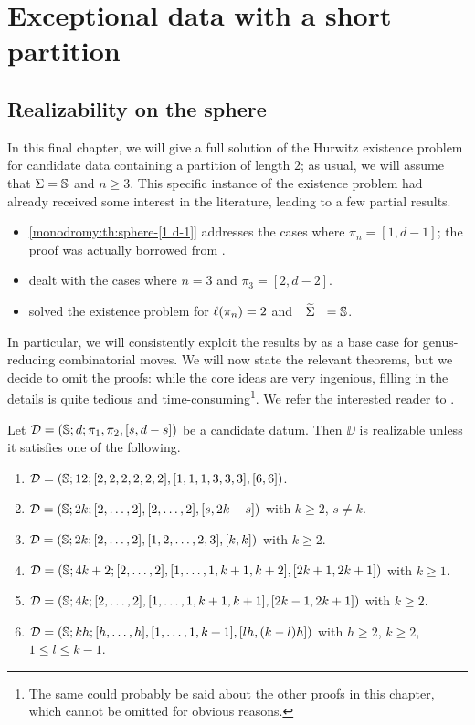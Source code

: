 \chapter{Exceptional data with a short partition}\label{short-partition:ch}
\smallvertices{}

\section{Realizability on the sphere}

In this final chapter, we will give a full solution of the Hurwitz existence problem for candidate data containing a partition of length $2$; as usual, we will assume that $\Sigma=\mathbb{S}{}$ and $n\ge 3$. This specific instance of the existence problem had already received some interest in the literature, leading to a few partial results.
\begin{itemize}
\item \cref{monodromy:th:sphere-[1 d-1]} addresses the cases where $\pi_n=[1,d-1]$; the proof was actually borrowed from .
\item \textcite{pervova-existence-ii} dealt with the cases where $n=3$ and $\pi_3=[2,d-2]$.
\item \textcite{pakovich} solved the existence problem for $\ell(\pi_n)=2$ and $\tSigma=\sphere{}$.
\end{itemize}
In particular, we will consistently exploit the results by \citeauthor{pakovich} as a base case for genus-reducing combinatorial moves. We will now state the relevant theorems, but we decide to omit the proofs: while the core ideas are very ingenious, filling in the details is quite tedious and time-consuming\footnote{The same could probably be said about the other proofs in this chapter, which cannot be omitted for obvious reasons.}. We refer the interested reader to \cite{pakovich}.

\begin{theorem}\label{short-partition:th:realizability-on-sphere-n-3}
Let $\mathcal{D}=(\mathbb{S}{};d;\pi_1,\pi_2,[s,d-s])$ be a candidate datum. Then $\DD$ is realizable unless it satisfies one of the following.
\begin{enumerate}[(1)]
\item $\mathcal{D}=(\mathbb{S}{};12;[2,2,2,2,2,2],[1,1,1,3,3,3],[6,6])$.
\item $\mathcal{D}=(\mathbb{S}{};2k;[2,\ldots,2],[2,\ldots,2],[s,2k-s])$ with $k\ge 2$, $s\neq k$.
\item $\mathcal{D}=(\mathbb{S}{};2k;[2,\ldots,2],[1,2,\ldots,2,3],[k,k])$ with $k\ge2$.
\item $\mathcal{D}=(\mathbb{S}{};4k+2;[2,\ldots,2],[1,\ldots,1,k+1,k+2],[2k+1,2k+1])$ with $k\ge 1$.
\item $\mathcal{D}=(\mathbb{S}{};4k;[2,\ldots,2],[1,\ldots,1,k+1,k+1],[2k-1,2k+1])$ with $k\ge2$.
\item\label{short-partition:th:realizability-on-sphere-n-3:it:6} $\mathcal{D}=(\mathbb{S}{};kh;[h,\ldots,h],[1,\ldots,1,k+1],[lh,(k-l)h])$ with $h\ge 2$, $k\ge 2$, $1\le l\le k-1$.
\end{enumerate}
\end{theorem}


